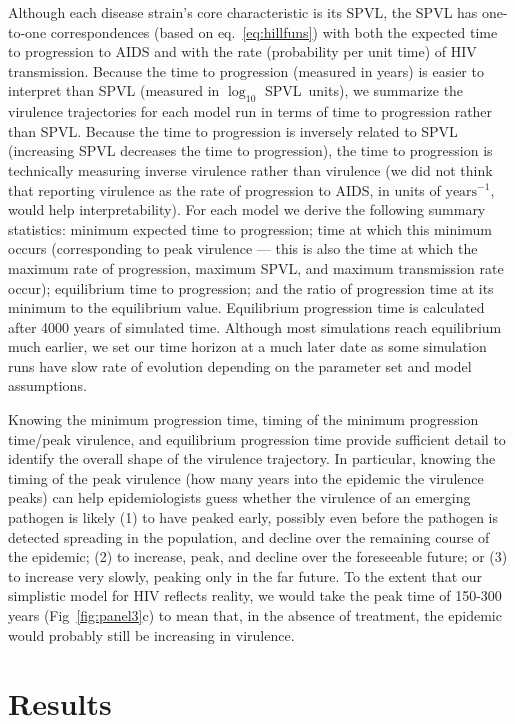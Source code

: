 \documentclass[10pt,letterpaper]{article}
\renewcommand{\figurename}{Fig}
\newcommand{\Lspvl}{$\log_{10}$ SPVL}
\begin{document}
Although each disease strain's core characteristic is its SPVL, the
SPVL has one-to-one correspondences (based on eq.~\ref{eq:hillfuns})
with both the expected time to progression to AIDS and with the rate
(probability per unit time) of HIV transmission. Because the time to
progression (measured in years) is easier to interpret than
SPVL (measured in \Lspvl\ units), we summarize the virulence
trajectories for each model run in terms of time to progression
rather than SPVL. Because the  time to progression is inversely
related to SPVL (increasing SPVL decreases the time to progression),
the time to progression is technically measuring inverse
virulence rather than virulence (we did not think that 
reporting virulence as the rate of progression to AIDS, in units
of $\textrm{years}^{-1}$, would help interpretability).
For each model we derive the following summary statistics:
minimum expected time to progression;
time at which this minimum occurs
(corresponding to peak virulence --- this is also the time at which the
maximum rate of progression, maximum SPVL, and maximum transmission rate
occur); equilibrium time to progression; 
and the ratio of progression time at its minimum to the equilibrium
value. Equilibrium progression time is calculated after 4000 years of simulated
time. Although most simulations reach equilibrium much earlier, we set our time horizon at a much later date as some simulation runs have slow rate of evolution depending on the parameter set and model assumptions.

Knowing the minimum progression time, timing of the minimum progression time/peak virulence, and equilibrium progression time provide sufficient detail to identify the overall shape of the virulence trajectory.
In particular, knowing the timing of the peak virulence (how many years
into the epidemic the virulence peaks) can help epidemiologists
guess whether the virulence of an emerging pathogen is likely (1)
to have peaked early, possibly even before the pathogen is detected
spreading in the population, and decline over the remaining course
of the epidemic; (2) to increase, peak, and decline over the
foreseeable future; or (3) to increase very slowly, peaking only
in the far future. To the extent that our simplistic model for HIV
reflects reality, we would take the peak time of 150-300 years 
(\figurename~\ref{fig:panel3}c) to mean that, in the absence of
treatment, the epidemic would probably still be increasing in virulence.

\section*{Results}
\end{document}
